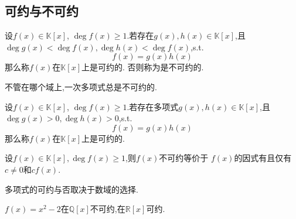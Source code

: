 \subsection{可约与不可约}
\begin{formal}
\begin{definition}[可约多项式与不可约多项式]\label{def:可约多项式与不可约多项式}
    设$f\left(x\right)\in\mathbb{K}\left[x\right]$,
    $\deg f\left(x\right)\geqslant 1$.若存在$g\left(x\right),h\left(x\right)\in\mathbb{K}\left[x\right]$,且
    $\deg g\left(x\right)<\deg f\left(x\right),\deg h\left(x\right)<\deg f\left(x\right)$,\textup{s.t.}
    \[f\left(x\right)=g\left(x\right)h\left(x\right)\]
    那么称$f\left(x\right)$在$\mathbb{K}\left[x\right]$上是可约的.
    否则称为是不可约的.
\end{definition}
\end{formal}
\begin{red}
\begin{remark}
    不管在哪个域上,一次多项式总是不可约的.
\end{remark}
\end{red}
\begin{formal}
\begin{definition}[可约的等价定义]\label{def:可约的等价定义}
    设$f\left(x\right)\in\mathbb{K}\left[x\right]$,
    $\deg f\left(x\right)\geqslant 1$.若存在多项式$g\left(x\right),h\left(x\right)\in\mathbb{K}\left[x\right]$,且
    $\deg g\left(x\right)>0,\deg h\left(x\right)>0$,\textup{s.t.}
    \[f\left(x\right)=g\left(x\right)h\left(x\right)\]
    那么称$f\left(x\right)$在$\mathbb{K}\left[x\right]$上是可约的.
\end{definition}
\end{formal}
\begin{formal}
\begin{definition}[不可约的等价定义]\label{def:不可约的等价定义}
    设$f\left(x\right)\in\mathbb{K}\left[x\right],\deg f\left(x\right)\geqslant 1$,则$f\left(x\right)$不可约等价于
    $f\left(x\right)$的因式有且仅有$c\neq 0$和$cf\left(x\right)$.
\end{definition}
\end{formal}
\begin{red}
\begin{remark}
    多项式的可约与否取决于数域的选择.
\end{remark}
\end{red}
\begin{brown}
\begin{example}
    $f\left(x\right)=x^2-2$在$\mathbb{Q}\left[x\right]$不可约,在$\mathbb{R}\left[x\right]$可约.
\end{example}
\end{brown}
